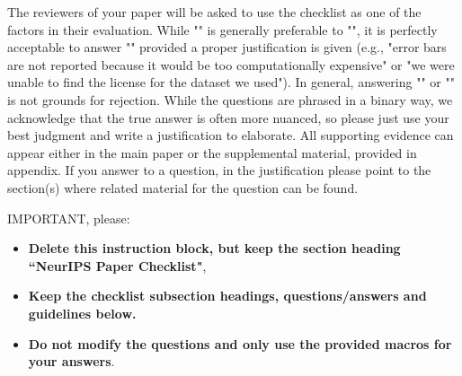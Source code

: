 \documentclass{article}
\theoremstyle{plain}
\theoremstyle{definition}
\theoremstyle{remark}
\begin{document}
The reviewers of your paper will be asked to use the checklist as one of the factors in their evaluation. While "\answerYes{}" is generally preferable to "\answerNo{}", it is perfectly acceptable to answer "\answerNo{}" provided a proper justification is given (e.g., "error bars are not reported because it would be too computationally expensive" or "we were unable to find the license for the dataset we used"). In general, answering "\answerNo{}" or "\answerNA{}" is not grounds for rejection. While the questions are phrased in a binary way, we acknowledge that the true answer is often more nuanced, so please just use your best judgment and write a justification to elaborate. All supporting evidence can appear either in the main paper or the supplemental material, provided in appendix. If you answer \answerYes{} to a question, in the justification please point to the section(s) where related material for the question can be found.

IMPORTANT, please:
\begin{itemize}
    \item {\bf Delete this instruction block, but keep the section heading ``NeurIPS Paper Checklist"},
    \item  {\bf Keep the checklist subsection headings, questions/answers and guidelines below.}
    \item {\bf Do not modify the questions and only use the provided macros for your answers}.
\end{itemize} 
 

\fi
\end{document}
